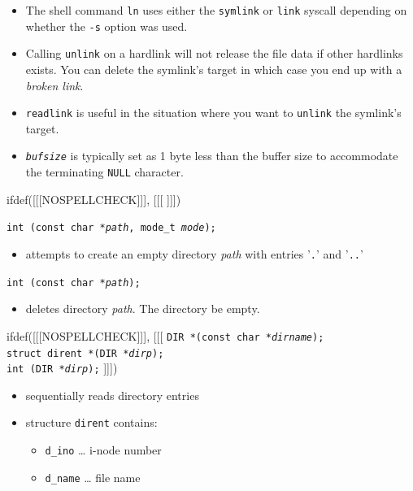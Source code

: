 \begin{itemize}
\item The shell command \texttt{ln} uses either the \texttt{symlink} or
\texttt{link} syscall depending on whether the \texttt{-s} option was used.
\item Calling \texttt{unlink} on a hardlink will not release the file data if
other hardlinks exists. You can delete the symlink's target in which case you
end up with a \emph{broken link}.
\item \texttt{readlink} is useful in the situation where you want to \texttt{unlink}
the symlink's target.
\item \emph{\texttt{bufsize}} is typically set as 1 byte less than the buffer
size to accommodate the terminating \texttt{NULL} character.
\end{itemize}


ifdef([[[NOSPELLCHECK]]], [[[
]]])

\begin{slide}
\texttt{int (const char *\emph{path}, mode\_t \emph{mode});}
\begin{itemize}
\item attempts to create an empty directory \emph{path} with entries
'\texttt{.}' and '\texttt{..}' 
\end{itemize}
\texttt{int (const char *\emph{path});}
\begin{itemize}
\item deletes directory \emph{path}.  The directory  be empty.
\end{itemize}
ifdef([[[NOSPELLCHECK]]], [[[
\texttt{DIR *(const char *\emph{dirname});}\\
\texttt{struct dirent *(DIR *\emph{dirp});}\\
\texttt{int (DIR *\emph{dirp});}
]]])
\begin{itemize}
\item sequentially reads directory entries
\item structure \texttt{dirent} contains:
    \begin{itemize}
    \item \texttt{d\_ino} \dots{} i-node number
    \item \texttt{d\_name} \dots{} file name
    \end{itemize}
\end{itemize}
\end{slide}


